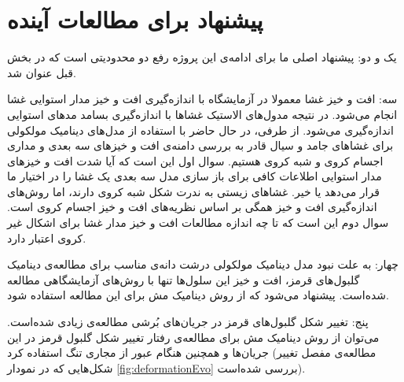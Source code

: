 %
%
\section{
پیشنهاد برای مطالعات آینده
}

یک و دو: پیشنهاد اصلی ما برای ادامه‌ی این پروژه رفع دو محدودیتی است که در بخش قبل عنوان شد. 

سه: افت و خیز غشا معمولا در آزمایشگاه با اندازه‌گیری افت و خیز مدار استوایی غشا انجام می‌شود. در نتیجه مدول‌های الاستیک غشاها با اندازه‌گیری بسامد مد‌های استوایی اندازه‌گیری می‌شود. از طرفی، در حال حاضر با استفاده از مدل‌های دینامیک مولکولی برای غشاها‌ی جامد و سیال قادر به بررسی دامنه‌ی افت‌ و خیز‌های سه بعدی و مداری اجسام کروی و شبه کروی هستیم. سوال اول این است که آیا شدت افت و خیز‌های مدار استوایی اطلاعات کافی برای باز سازی مدل سه بعدی یک غشا را در اختیار ما قرار می‌دهد یا خیر. غشا‌های زیستی به ندرت شکل شبه کروی دارند، اما روش‌های اندازه‌گیری افت و خیز همگی بر اساس نظریه‌های افت و خیز اجسام کروی است. سوال دوم این است که تا چه اندازه مطالعات افت و خیز مدار غشا برای اشکال غیر کروی اعتبار دارد.

چهار: به علت نبود مدل دینامیک مولکولی درشت دانه‌ی مناسب برای مطالعه‌ی دینامیک گلبول‌های قرمز، افت و خیز این سلول‌ها تنها با روش‌های آزمایشگاهی مطالعه شده‌است. پیشنهاد می‌شود که از روش دینامیک مش برای این مطالعه استفاده شود. 

پنج: تغییر شکل گلبول‌های قرمز در جریان‌های بُرشی مطالعه‌ی زیادی شده‌است. می‌توان از روش دینامیک مش  برای مطالعه‌ی  رفتار تغییر شکل گلبول قرمز در این جریان‌ها و همچنین هنگام عبور از مجاری تنگ استفاده کرد (مطالعه‌ی مفصل تغییر شکل‌هایی که در نمودار
\ref{fig:deformationEvo}
بررسی شده‌است). 








